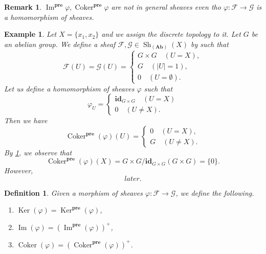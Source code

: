 \documentclass{article}
\newtheorem{definition}{Definition}[section]
\newtheorem{remark}{Remark}[section]
\newtheorem{example}{Example}[section]
\numberwithin{equation}{section}
\DeclareMathOperator{\Sh}{Sh}
\DeclareMathOperator{\Ker}{Ker}
\DeclareMathOperator{\Image}{Im}
\DeclareMathOperator{\Coker}{Coker}
\begin{document}
\begin{remark}
$\Image^{\mathbf{pre}}\varphi,\Coker^{\mathbf{pre}}\varphi$ are not in general sheaves even tho $\varphi:\mathcal{F}\to\mathcal{G}$ is a homomorphism of sheaves.
\label{sheaf_condition_kernel}
\end{remark}

\begin{example}
Let $X=\{x_1,x_2\}$ and we assign the discrete topology to it. Let $G$ be an abelian group. We define a sheaf $\mathcal{F},\mathcal{G}\in\Sh_{(\mathbf{Ab})}(X)$ by such that
\begin{equation*}
\mathcal{F}(U)=\mathcal{G}(U) = 
\begin{cases}
G\times G\quad (U=X),\\
G \quad (|U|=1),\\
0\quad (U=\emptyset).
\end{cases}
\end{equation*}
Let us define a homomorphism of sheaves $\varphi$ such that
\begin{equation*}
\varphi_U = 
\begin{cases}
\mathbf{id}_{G\times G}\quad (U=X)\\
0\quad (U\not= X).
\end{cases}
\end{equation*}
Then we have
\begin{equation*}
\Coker^{\mathbf{pre}}(\varphi)(U) = 
\begin{cases}
0\quad (U=X),\\
G\quad (U\not= X).
\end{cases}
\end{equation*}
By \ref{sheaf_condition_kernel}, we observe that
\begin{equation*}
\Coker^{\mathbf{pre}}(\varphi)(X)=G\times G/\mathbf{id}_{G\times G}(G\times G) = \{0\}.
\end{equation*}
However, 
\begin{equation*}
later.
\end{equation*}
\end{example}

\begin{definition}
Given a morphism of sheaves $\varphi:\mathcal{F}\to\mathcal{G}$, we define the following.
\begin{enumerate}[1).]
\item $\Ker(\varphi)=\Ker^{\mathbf{pre}}(\varphi)$,
\item $\Image(\varphi)=(\Image^{\mathbf{pre}}(\varphi))^+$,
\item $\Coker(\varphi)=(\Coker^{\mathbf{pre}}(\varphi))^+$.
\end{enumerate}
\end{definition}
\end{document}
